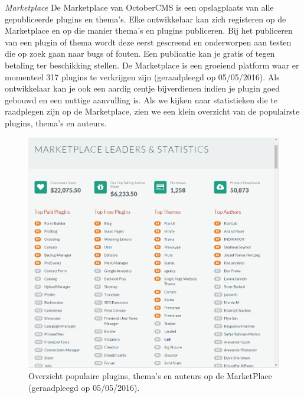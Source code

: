 \pagebreak
\noindent
\textit{Marketplace}\newline
De Marketplace van OctoberCMS is een opslagplaats van alle gepubliceerde plugins en thema's. Elke ontwikkelaar kan zich registeren op de Marketplace en op die manier thema's en plugins publiceren. Bij het publiceren van een plugin of thema wordt deze eerst gescreend en onderworpen aan testen die op zoek gaan naar bugs of fouten. Een publicatie kan je gratis of tegen betaling ter beschikking stellen. De Marketplace is een groeiend platform waar er momenteel 317 plugins te verkrijgen zijn (geraadpleegd op 05/05/2016). Als ontwikkelaar kan je ook een aardig centje bijverdienen indien je plugin goed gebouwd en een nuttige aanvulling is. Als we kijken naar statistieken die te raadplegen zijn op de Marketplace, zien we een klein overzicht van de populairste plugins, thema's en auteurs.

\begin{figure}[!ht]
  \includegraphics[width=\linewidth]{img/oc-marketplace-plugins.png}
  \caption{Overzicht populaire plugins, thema's en auteurs op de MarketPlace (geraadpleegd op 05/05/2016).}
  \label{fig:Overzicht populaire plugins, thema's en auteurs op de MarketPlace}
\end{figure}

\pagebreak

